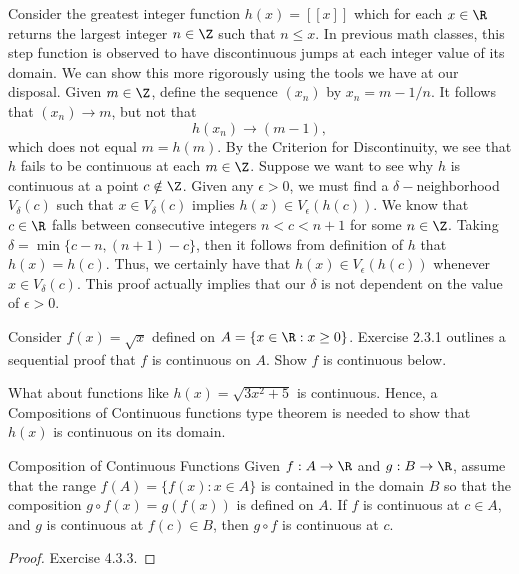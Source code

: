 \begin{example}{}{}
    Consider the greatest integer function \( h(x) = [[x]] \) which for each \( x \in \R  \) returns the largest integer \( n \in \Z  \) such that \( n \leq x  \). In previous math classes, this step function is observed to have discontinuous jumps at each integer value of its domain. We can show this more rigorously using the tools we have at our disposal. Given \( m \in \Z  \), define the sequence \( (x_n)  \) by \( x_n = m -  1/n \). It follows that \( (x_n) \to m \), but not that 
    \[  h(x_n) \to (m-1), \]
    which does not equal \( m = h(m) \). By the Criterion for Discontinuity, we see that \( h \) fails to be continuous at each \( m \in \Z  \). Suppose we want to see why \( h  \) is continuous at a point \( c \notin \Z \). Given any \( \epsilon > 0  \), we must find a \( \delta-\)neighborhood \( V_{\delta}(c) \) such that \( x \in V_{\delta}(c) \) implies \( h(x) \in V_{\epsilon }(h(c)) \). We know that \( c \in \R  \) falls between consecutive integers \( n < c < n+1 \) for some \(  n \in \Z  \). Taking \( \delta = \min \{ c -n , (n+1) - c  \}  \), then it follows from definition of \( h \) that \( h(x) = h(c) \). Thus, we certainly have that \( h(x) \in V_{\epsilon }(h(c)) \) whenever \( x \in V_{\delta}(c) \). This proof actually implies that our \( \delta \) is not dependent on the value of \( \epsilon > 0  \). 
\end{example}

\begin{example}{}{}
Consider \( f(x) = \sqrt{ x }  \) defined on \( A = \{ x \in \R : x \geq 0 \}  \). Exercise 2.3.1 outlines a sequential proof that \( f  \) is continuous on \( A  \). Show \( f \) is continuous below.
\end{example}

What about functions like \( h(x) = \sqrt{ 3x^2 + 5  }   \) is continuous. Hence, a Compositions of Continuous functions type theorem is needed to show that \( h(x) \) is continuous on its domain.


\begin{theorem}{Composition of Continuous Functions}{}
    Given \( f: A \to \R  \) and \( g: B \to \R  \), assume that the range \( f(A) = \{ f(x) : x \in A  \}  \) is contained in the domain \( B  \) so that the composition \( g \circ f(x) = g(f(x)) \) is defined on \( A  \). If \( f \) is continuous at \( c \in A  \), and \( g  \) is continuous at \( f(c) \in B  \), then \( g \circ f  \) is continuous at \( c  \).

    \end{theorem}

\begin{proof}
Exercise 4.3.3.
\end{proof}



